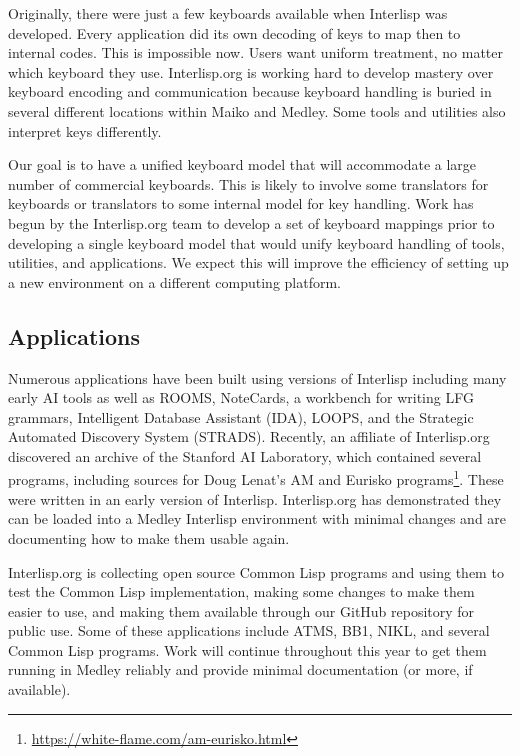 \documentclass[sigconf]{acmart}
\begin{document}
Originally, there were just a few keyboards available when Interlisp was developed. Every application did its own decoding of keys to map then to internal codes. This is impossible now. Users want uniform treatment, no matter which keyboard they use. Interlisp.org is working hard to develop mastery over keyboard encoding and communication because keyboard handling is buried in several different locations within Maiko and Medley. Some tools and utilities also interpret keys differently.

Our goal is to have a unified keyboard model that will accommodate a large number of commercial keyboards. This is likely to involve some translators for keyboards or translators to some internal model for key handling. Work has begun by the Interlisp.org team to develop a set of keyboard mappings prior to developing a single keyboard model that would unify keyboard handling of tools, utilities, and applications. We expect this will improve the efficiency of setting up a new environment on a different computing platform.

\subsection{Applications}

Numerous applications have been built using versions of Interlisp including many early AI tools as well as ROOMS\cite{Henderson86}, NoteCards\cite{Xerox85}, a workbench for writing LFG grammars\cite{Kaplan03}, Intelligent Database Assistant (IDA), LOOPS, and the Strategic Automated Discovery System (STRADS). Recently, an affiliate of Interlisp.org discovered an archive of the Stanford AI Laboratory, which contained several programs, including sources for Doug Lenat's AM and Eurisko programs\footnote{\url{https://white-flame.com/am-eurisko.html}}. These were written in an early version of Interlisp. Interlisp.org has demonstrated they can be loaded into a Medley Interlisp environment with minimal changes and are documenting how to make them usable again.

Interlisp.org is collecting open source Common Lisp programs and using them to test the Common Lisp implementation, making some changes to make them easier to use, and making them available through our GitHub repository for public use. Some of these applications include ATMS, BB1, NIKL, and several Common Lisp programs. Work will continue throughout this year to get them running in Medley reliably and provide minimal documentation (or more, if available).
\end{document}
